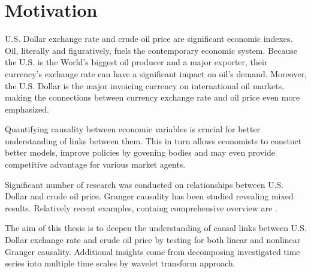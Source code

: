 \section{Motivation} \label{sec:motivation}

U.S. Dollar exchange rate and crude oil price are significant economic indexes.
Oil, literally and figuratively, fuels the contemporary economic system.
Because the U.S. is the World's biggest oil producer and a major exporter, their currency's exchange rate 
can have a significant impact on oil's demand. Moreover, the U.S. Dollar is the major invoicing currency
on international oil markets, making the connections between currency exchange rate and oil price even more
emphasized.

Quantifying causality between economic variables is crucial for better understanding of links between them.
This in turn allows economists to constuct better models, improve policies by govening bodies and may even 
provide competitive advantage for various market agents.

Significant number of research was conducted on relationships between U.S. Dollar and crude oil price.
Granger causality has been studied revealing mixed results. Relatively recent examples, containg comprehensive
overview are \cite{2010-oil-dollar, 2012-benhmad, 2017-oil-dollar, 2020-beckmann}.

The aim of this thesis is to deepen the understanding of causal links between U.S. Dollar exchange rate
and crude oil price by testing for both linear and nonlinear Granger causality.
Additional insights come from decomposing investigated time series into multiple time scales by wavelet
transform approach.
